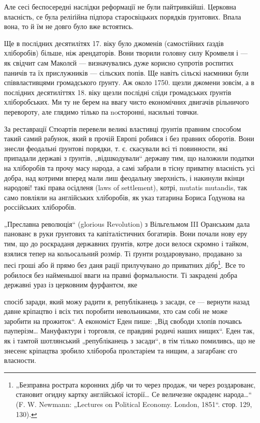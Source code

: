 Але сесі беспосередні наслідки реформації не були
пайтривкійші. Церковна власність, се була реліґійна підпора
старосвіцьких порядків ґрунтових. Впала вона, то й їм не
довго було вже встоятись.

Ще в послідних десятилітях 17. віку було джоменів
(самостійних ґаздів хліборобів) більше, ніж арендаторів.
Вони творили головну силу Кромвеля і — як свідчит сам
Маколєй — визначувались дуже корисно супротів роспитих
паничів та їх прислужників — сільских попів. Ще навіть
сільскі наємники були співвластивцями громадського ґрунту.
Аж около 1750. щезли джомени зовсім, а в послідних десятиліттях
18. віку щезли послідні сліди громадських ґрунтів
хліборобських. Ми ту не берем на ввагу чисто економічних
двигачів рільничого перевороту, але глядимо тілько па noсторонні,
насильні товчки.

За реставрації Стюартів перевели великі властивці
ґрунтів правним способом такий самий рабунок, який в прочій
Европі робився і без правних оборотів. Вони знесли
феодальні ґрунтові порядки, т. є. скасували всі ті повинности,
які припадали державі з ґрунтів, „відшкодували“ державу
тим, що наложили податки на хліборобів та прочу
масу народа, а самі забрали в тісну приватну власність усі
добра, над котрими вперед мали лиш феодальну зверхність,
і накинули вкінци народові! такі права осідленя (laws of
settlement), котрі, mutatis mutandis, так само повліяли на
англійських хліборобів, як указ татарина Бориса Ґодунова
на россійських хліборобів.

„Преславна революція“ (glorious Revolution) з Вільгельмом
III Оранським дала панованє в руки ґрунтових та капіталістичних
богатирів. Вони почали нову еру тим, що до
роскраданя державних ґрунтів, котре доси велося скромно
і тайком, взялися тепер на кольосальний розмір. Ті ґрунти
роздаровувано, продавано за песі гроші або й прямо без
даня рації прилучувано до приватних дібр\footnote{
„Безправна рострата коронних дібр чи то через продаж, чи через
роздарованє, становит огидну картку англійської історії\dots{} Се величезне
окраденє народа\dots{}“ (F. W. Newmann: „Lectures on Political Economy.
London, 1851“. стор. 129, 130).
}. Все то робилося
без найменьшої вваги на правні формальности. Ті закрадені
добра державні ураз із церковним фурфантєм, яке

спосіб заради, який можу радити я, републіканець з засади, се — вернути
назад давне кріпацтво і всіх тих поробити невольниками, хто сам
собі не може заробити на прожиток“. А економіст Еден пише: „Від свободи
хлопів почавсь пауперізм\dots{} Мануфактури і торговля, се правдиві
родичі наших нищих“. Еден так, як і тамтой шотлянський „републіканець
з засади“, в тім тілько помиливсь, що не знесенє кріпацтва зробило хлібороба
пролєтаріем та нищим, а загарбанє єго власности.
\parbreak{}
